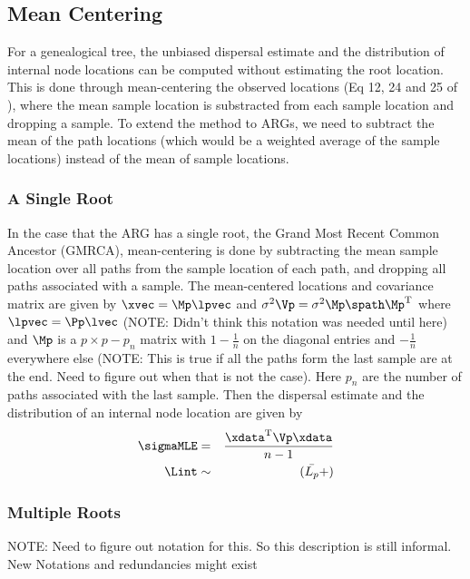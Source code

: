 \subsection{Mean Centering}

For a genealogical tree, the unbiased dispersal estimate and the distribution of internal node locations can be computed without estimating the root location. This is done through mean-centering the observed locations (Eq 12, 24 and 25 of \cite{Osmond2021}), where the mean sample location is substracted from each sample location and dropping a sample. To extend the method to ARGs, we need to subtract the mean of the path locations (which would be a weighted average of the sample locations) instead of the mean of sample locations. 

\subsubsection*{A Single Root}

In the case that the ARG has a single root, the Grand Most Recent Common Ancestor (GMRCA), mean-centering is done by subtracting the mean sample location over all paths from the sample location of each path, and dropping all paths associated with a sample. The mean-centered locations and covariance matrix are given by $\xvec = \Mp \lpvec $ and $\sigma^2 \Vp = \sigma^2 \Mp \spath \Mp^\text{T}$ where $\lpvec= \Pp \lvec$ (NOTE: Didn't think this notation was needed until here) and $\Mp$ is a $p \times p-p_n$ matrix with $1 - \displaystyle \frac{1}{n}$ on the diagonal entries and $\displaystyle -\frac{1}{n}$ everywhere else (NOTE: This is true if all the paths form the last sample are at the end. Need to figure out when that is not the case). Here $p_n$ are the number of paths associated with the last sample. Then the dispersal estimate and the distribution of an internal node location are given by 
\begin{eqnarray}
    \sigmaMLE &=& \displaystyle \frac{ \xdata^\text{T} \Vp \xdata }{n-1} \\
    \Lint &\sim& (\bar{L_p} + ) 
\end{eqnarray}

\subsubsection*{Multiple Roots} 

NOTE: Need to figure out notation for this. So this description is still informal. New Notations and redundancies might exist

